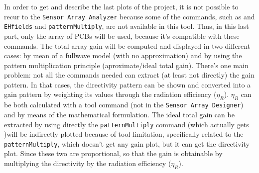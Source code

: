 \documentclass[12pt,a4paper]{article}
\begin{document}
{In order to get and describe the last plots of the project, it is not possible to recur to the \texttt{\color{Mahogany}Sensor Array Analyzer} because some of the commands, such as  and \texttt{\color{Turquoise}EHfields} and \texttt{\color{Turquoise}patternMultiply}, are not available in this tool. Thus, in this last part, only the array of PCBs will be used, because it's compatible with these commands. The total array gain will be computed and displayed in two different cases: by mean of a fullwave model (with no approximation) and by using the pattern multiplication principle (aproximate/ideal total gain). There's one main problem: not all the commands needed can extract (at least not directly) the gain pattern. In that cases, the directivity pattern can be shown and converted into a gain pattern by weighting its values through the radiation efficiency ($\eta_R$). $\eta_R$ can be both calculated with a tool command (not in the \texttt{\color{Mahogany}Sensor Array Designer}) and by means of the mathematical formulation. The ideal total gain can be extracted by using directly the \texttt{\color{Turquoise}patternMultiply} command (which actually gets )will be indirectly plotted because of tool limitation, specifically related to the \texttt{\color{Turquoise}patternMultiply}, which doesn't get any gain plot, but it can get the directivity plot. Since these two are proportional, so that the gain is obtainable by multiplying the directivity by the radiation efficiency ($\eta_R$). 






\newpage 

\printbibliography

}
\end{document}
